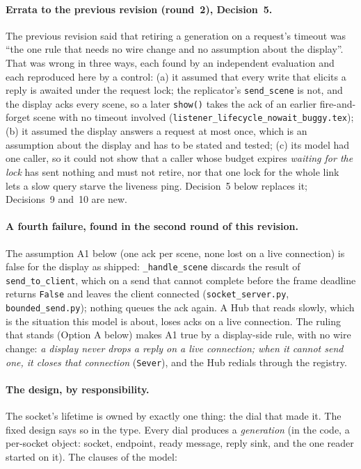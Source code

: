 \documentclass[a4paper,10pt,fleqn]{article}
\begin{document}
\paragraph{Errata to the previous revision (round~2), Decision~5.}
The previous revision said that retiring a generation on a request's timeout
was ``the one rule that needs no wire change and no assumption about the
display''.  That was wrong in three ways, each found by an independent
evaluation and each reproduced here by a control:
(a) it assumed that every write that elicits a reply is awaited under the
request lock; the replicator's \texttt{send\_scene} is not, and the display acks
every scene, so a later \texttt{show()} takes the ack of an earlier
fire-and-forget scene with no timeout involved
(\texttt{listener\_lifecycle\_nowait\_buggy.tex});
(b) it assumed the display answers a request at most once, which is an
assumption about the display and has to be stated and tested;
(c) its model had one caller, so it could not show that a caller whose budget
expires \emph{waiting for the lock} has sent nothing and must not retire, nor
that one lock for the whole link lets a slow query starve the liveness ping.
Decision~5 below replaces it; Decisions~9 and~10 are new.

\paragraph{A fourth failure, found in the second round of this revision.}
The assumption A1 below (one ack per scene, none lost on a live connection) is
false for the display as shipped: \texttt{\_handle\_scene} discards the result of
\texttt{send\_to\_client}, which on a send that cannot complete before the frame
deadline returns \texttt{False} and leaves the client connected
(\texttt{socket\_server.py}, \texttt{bounded\_send.py}); nothing queues the ack
again.  A Hub that reads slowly, which is the situation this model is about,
loses acks on a live connection.  The ruling that stands (Option A below) makes
A1 true by a display-side rule, with no wire change: \emph{a display never
drops a reply on a live connection; when it cannot send one, it closes that
connection} (\texttt{Sever}), and the Hub redials through the registry.

\paragraph{The design, by responsibility.}
The socket's lifetime is owned by exactly one thing: the dial that made it.
The fixed design says so in the type.  Every dial produces a \emph{generation}
(in the code, a per-socket object: socket, endpoint, ready message, reply
sink, and the one reader started on it).  The clauses of the model:
\end{document}
